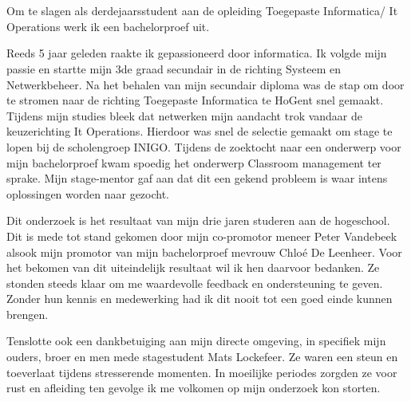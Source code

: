 
\chapter*{}%
\label{ch:voorwoord}


Om te slagen als derdejaarsstudent aan de opleiding Toegepaste Informatica/ It Operations werk ik een bachelorproef uit.\newline

Reeds 5 jaar geleden raakte ik gepassioneerd door informatica. Ik volgde mijn passie en startte mijn 3de graad secundair in de richting Systeem en Netwerkbeheer. Na het behalen van mijn secundair diploma was de stap om door te stromen naar de richting Toegepaste Informatica te HoGent snel gemaakt. Tijdens mijn studies bleek dat netwerken mijn aandacht trok vandaar de keuzerichting It Operations. Hierdoor was snel de selectie gemaakt om stage te lopen bij de scholengroep INIGO. Tijdens de zoektocht naar een onderwerp voor mijn bachelorproef kwam spoedig het onderwerp Classroom management ter sprake. Mijn stage-mentor gaf aan dat dit een gekend probleem is waar intens oplossingen worden naar gezocht.\newline

Dit onderzoek is het resultaat van mijn drie jaren studeren aan de hogeschool. Dit is mede tot stand gekomen door mijn co-promotor meneer Peter Vandebeek alsook mijn promotor van mijn bachelorproef mevrouw Chloé De Leenheer. Voor het bekomen van dit uiteindelijk resultaat wil ik hen daarvoor bedanken. Ze stonden steeds klaar om me waardevolle feedback en ondersteuning te geven. Zonder hun kennis en medewerking had ik dit nooit tot een goed einde kunnen brengen. \newline

Tenslotte ook een dankbetuiging aan mijn directe omgeving, in specifiek mijn ouders, broer en men mede stagestudent Mats Lockefeer. Ze waren een steun en toeverlaat tijdens stresserende momenten. In moeilijke periodes zorgden ze voor rust en afleiding ten gevolge ik me volkomen op mijn onderzoek kon storten. 



